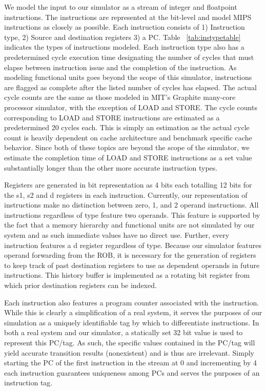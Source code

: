 \documentclass{acm_proc_article-sp}
\begin{document}
We model the input to our simulator as a stream of integer and floatpoint instructions.  The instructions are represented at the bit-level and model MIPS instructions as closely as possible.  Each instruction consists of 1) Instruction type, 2) Source and destination registers 3) a PC.  Table ~\ref{tab:instypetable} indicates the types of instructions modeled.  Each instruction type also has a predetermined cycle execution time designating the number of cycles that must elapse between instruction issue and the completion of the instruction.  As modeling functional units goes beyond the scope of this simulator, instructions are flagged as complete after the listed number of cycles has elapsed.  The actual cycle counts are the same as those modeled in MIT's Graphite many-core processor simulator\cite{graphite}, with the exception of LOAD and STORE.  The cycle counts corresponding to LOAD and STORE instructions are estimated as a predetermined 20 cycles each.  This is simply an estimation as the actual cycle count is heavily dependent on cache architecture and benchmark specific cache behavior.  Since both of these topics are beyond the scope of the simulator, we estimate the completion time of LOAD and STORE instructions as a set value substantially longer than the other more accurate instruction types.

Registers are generated in bit representation as 4 bits each totalling 12 bits for the s1, s2 and d registers in each instruction. Currently, our representation of instructions make no distinction between zero, 1, and 2 operand instructions.  All instructions regardless of type feature two operands.  This feature is supported by the fact that a memory hierarchy and functional units are not simulated by our system and as such immediate values have no direct use.  Further, every instruction features a d register regardless of type.  Because our simulator features operand forwarding from the ROB, it is necessary for the generation of registers to keep track of past destination registers to use as dependent operands in future instructions.  This history buffer is implemented as a rotating bit register from which prior destination registers can be indexed.

Each instruction also features a program counter associated with the instruction.  While this is clearly a simplification of a real system, it serves the purposes of our simulation as a uniquely identifiable tag by which to differentiate instructions.  In both a real system and our simulator, a statically set 32 bit value is used to represent this PC/tag.  As such, the specific values contained in the PC/tag will yield accurate transition results (nonexistent) and is thus are irrelevant.  Simply starting the PC of the first instruction in the stream at 0 and incrementing by 4 each instruction guarantees uniqueness among PCs and serves the purposes of an instruction tag.
\end{document}
